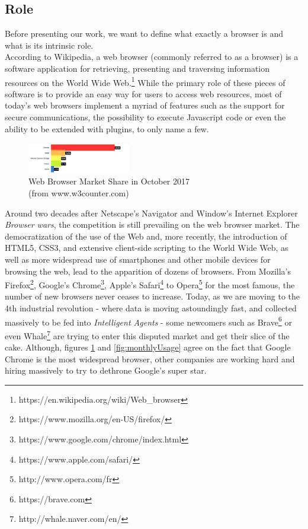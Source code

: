 \documentclass[journal]{IEEEtran}
\begin{document}
\subsection{Role}
Before presenting our work, we want to define what exactly a browser is and what is its intrinsic role. \\
According to Wikipedia, a web browser (commonly referred to as a browser) is a software application for retrieving, presenting and traversing information resources on the World Wide Web.\footnote{https://en.wikipedia.org/wiki/Web\_browser} 
While the primary role of these pieces of software is to provide an easy way for users to access web resources, most of today's web browsers implement a myriad of features such as the support for secure communications, the possibility to execute Javascript code or even the ability to be extended with plugins, to only name a few.

\begin{figure}[h]
\includegraphics[width=0.4\textwidth]{images/WebBrowserMarketShare.png}
\caption{Web Browser Market Share in October 2017 \\ (from www.w3counter.com)}
\label{fig:marketShare}
\end{figure}

Around two decades after Netscape's Navigator and Window's Internet Explorer \emph{Browser wars}, the competition is still prevailing on the web browser market. The democratization of the use of the Web and, more recently, the introduction of HTML5, CSS3, and extensive client-side scripting to the World Wide Web, as well as more widespread use of smartphones and other mobile devices for browsing the web, lead to the apparition of dozens of browsers. From Mozilla's Firefox\footnote{https://www.mozilla.org/en-US/firefox/}, Google's Chrome\footnote{https://www.google.com/chrome/index.html}, Apple's Safari\footnote{https://www.apple.com/safari/} to Opera\footnote{http://www.opera.com/fr} for the most famous, the number of new browsers never ceases to increase. Today, as we are moving to the 4th industrial revolution - where data is moving astoundingly fast, and collected massively to be fed into \emph{Intelligent Agents} - some newcomers such as Brave\footnote{https://brave.com} or even Whale\footnote{http://whale.naver.com/en/} are trying to enter this disputed market and get their slice of the cake.
Although, figures \ref{fig:marketShare} and \ref{fig:monthlyUsage} agree on the fact that Google Chrome is the most widespread browser, other companies are working hard and hiring massively to try to dethrone Google's super star.
\end{document}
